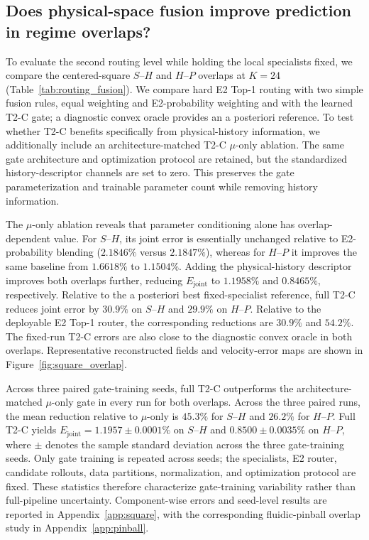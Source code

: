\subsection{Does physical-space fusion improve prediction in regime overlaps?}
To evaluate the second routing level while holding the local specialists fixed, we compare the centered-square $S$--$H$ and $H$--$P$ overlaps at $K=24$ (Table~\ref{tab:routing_fusion}). We compare hard E2 Top-1 routing with two simple fusion rules, equal weighting and E2-probability weighting and with the learned T2-C gate; a diagnostic convex oracle provides an a posteriori reference. To test whether T2-C benefits specifically from physical-history information, we additionally include an architecture-matched T2-C $\mu$-only ablation. The same gate architecture and optimization protocol are retained, but the standardized history-descriptor channels are set to zero. This preserves the gate parameterization and trainable parameter count while removing history information.


The $\mu$-only ablation reveals that parameter conditioning alone has overlap-dependent value. For $S$--$H$, its joint error is essentially unchanged relative to E2-probability blending ($2.1846\%$ versus $2.1847\%$), whereas for $H$--$P$ it improves the same baseline from $1.6618\%$ to $1.1504\%$. Adding the physical-history descriptor improves both overlaps further, reducing $E_{\mathrm{joint}}$ to $1.1958\%$ and $0.8465\%$, respectively. Relative to the a posteriori best fixed-specialist reference, full T2-C reduces joint error by $30.9\%$ on $S$--$H$ and $29.9\%$ on $H$--$P$. Relative to the deployable E2 Top-1 router, the corresponding reductions are $30.9\%$ and $54.2\%$. The fixed-run T2-C errors are also close to the diagnostic convex oracle in both overlaps. Representative reconstructed fields and velocity-error maps are shown in Figure~\ref{fig:square_overlap}.

Across three paired gate-training seeds, full T2-C outperforms the architecture-matched $\mu$-only gate in every run for both overlaps.
Across the three paired runs, the mean reduction relative to $\mu$-only is $45.3\%$ for $S$--$H$ and $26.2\%$ for $H$--$P$. Full T2-C yields
$E_{\mathrm{joint}}=1.1957\pm0.0001\%$ on $S$--$H$ and $0.8500\pm0.0035\%$ on $H$--$P$, where $\pm$ denotes the sample standard
deviation across the three gate-training seeds. Only gate training is repeated across seeds; the specialists, E2 router, candidate rollouts, data partitions, normalization, and optimization protocol are fixed. These statistics therefore characterize gate-training variability rather than full-pipeline uncertainty. Component-wise errors and seed-level results are reported in Appendix~\ref{app:square}, with the corresponding fluidic-pinball overlap study in Appendix~\ref{app:pinball}.


